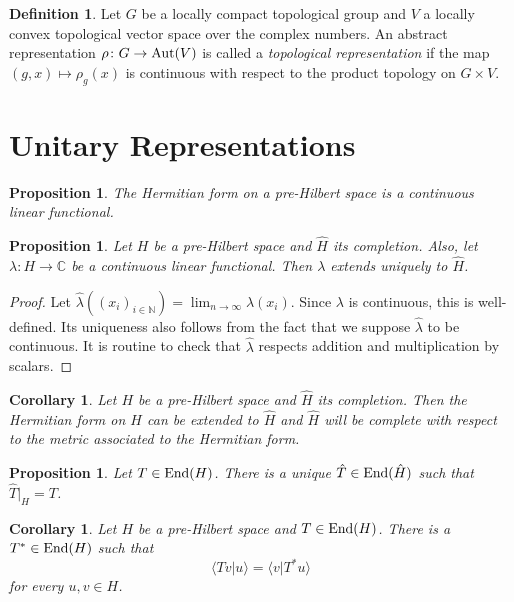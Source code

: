 \documentclass[12pt]{article}
\newtheorem{prop}[thm]{Proposition}
\newtheorem{corollary}[thm]{Corollary}
\theoremstyle{definition}
\newtheorem{dfn}[thm]{Definition}
\theoremstyle{remark}
\newcommand{\End}[1]{\textup{End}(#1)}
\begin{document}
    \begin{dfn}
        Let $G$ be a locally compact topological group and $V$ a locally convex topological vector space over the complex numbers. An abstract representation $\rho\colon G\to\textup{Aut}(V)$ is called a \emph{topological representation} if the map $(g,x)\mapsto\rho_g(x)$ is continuous with respect to the product topology on $G\times V$.
    \end{dfn}

    \section{Unitary Representations}

    \begin{prop}
        The Hermitian form on a pre-Hilbert space is a continuous linear functional.
    \end{prop}

    \begin{prop}
        Let $H$ be a pre-Hilbert space and $\hat H$ its completion. Also, let $\lambda\colon H\to\mathbb{C}$ be a continuous linear functional. Then $\lambda$ extends uniquely to $\hat H$.
    \end{prop}

    \begin{proof}
        Let $\hat \lambda((x_i)_{i\in\mathbb{N}})=\lim_{n\to\infty}\lambda(x_i)$. Since $\lambda$ is continuous, this is well-defined. Its uniqueness also follows from the fact that we suppose $\hat \lambda$ to be continuous. It is routine to check that $\hat \lambda$ respects addition and multiplication by scalars.
    \end{proof}

    \begin{corollary}
        Let $H$ be a pre-Hilbert space and $\hat{H}$ its completion. Then the Hermitian form on $H$ can be extended to $\hat{H}$ and $\hat{H}$ will be complete with respect to the metric associated to the Hermitian form.
    \end{corollary}

    \begin{prop}
        Let $T\in\End{H}$. There is a unique $\hat T\in\End{\hat H}$ such that $\hat T|_H = T$.
    \end{prop}

    \begin{corollary}
        Let $H$ be a pre-Hilbert space and $T\in\End{H}$. There is a $T^*\in\End{H}$ such that
        $$
        \langle Tv|u \rangle = \langle v|T^*u \rangle
        $$
        for every $u,v\in H$.
    \end{corollary}
\end{document}
